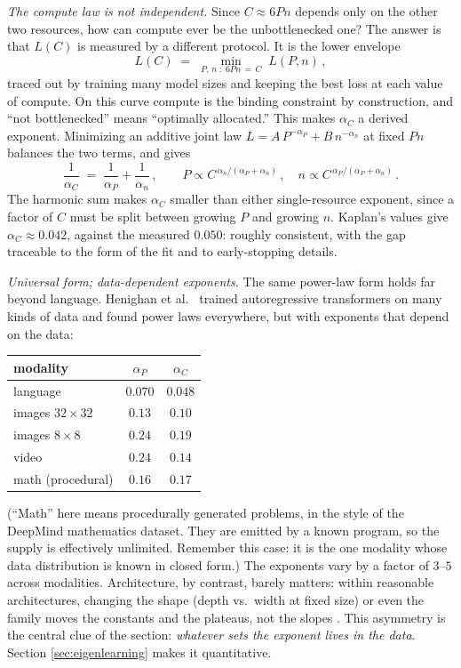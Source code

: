 \documentclass[11pt]{article}
\begin{document}
\emph{The compute law is not independent.} Since $C\approx 6Pn$ depends only on the other two resources, how can compute ever be the unbottlenecked one? The answer is that $L(C)$ is measured by a different protocol. It is the lower envelope
%
\begin{equation} \label{compute-envelope}
    L(C) \;=\; \min_{P,\,n\;:\;6Pn\,=\,C}\; L(P, n)\,,
\end{equation}
%
traced out by training many model sizes and keeping the best loss at each value of compute. On this curve compute is the binding constraint by construction, and ``not bottlenecked'' means ``optimally allocated.'' This makes $\alpha_C$ a derived exponent. Minimizing an additive joint law $L = A\,P^{-\alpha_P} + B\,n^{-\alpha_n}$ at fixed $Pn$ balances the two terms, and gives
%
\begin{equation} \label{harmonic}
    \frac{1}{\alpha_C} \;=\; \frac{1}{\alpha_P} + \frac{1}{\alpha_n}\,,
    \qquad
    P \propto C^{\,\alpha_n/(\alpha_P + \alpha_n)}\,,\quad
    n \propto C^{\,\alpha_P/(\alpha_P + \alpha_n)}\,.
\end{equation}
%
The harmonic sum makes $\alpha_C$ smaller than either single-resource exponent, since a factor of $C$ must be split between growing $P$ and growing $n$. Kaplan's values give $\alpha_C\approx 0.042$, against the measured $0.050$: roughly consistent, with the gap traceable to the form of the fit and to early-stopping details.

\emph{Universal form; data-dependent exponents.} The same power-law form holds far beyond language. Henighan et al.\ \cite{henighan2020scaling} trained autoregressive transformers on many kinds of data and found power laws everywhere, but with exponents that depend on the data:
%
\begin{center}
\small
\begin{tabular}{l|cc}
    modality & $\alpha_P$ & $\alpha_C$ \\\hline
    language & $0.070$ & $0.048$ \\
    images $32{\times}32$ & $0.13$ & $0.10$ \\
    images $8{\times}8$ & $0.24$ & $0.19$ \\
    video & $0.24$ & $0.14$ \\
    math (procedural) & $0.16$ & $0.17$
\end{tabular}
\end{center}
%
(``Math'' here means procedurally generated problems, in the style of the DeepMind mathematics dataset. They are emitted by a known program, so the supply is effectively unlimited. Remember this case: it is the one modality whose data distribution is known in closed form.) The exponents vary by a factor of $3$--$5$ across modalities. Architecture, by contrast, barely matters: within reasonable architectures, changing the shape (depth vs.\ width at fixed size) or even the family moves the constants and the plateaus, not the slopes \cite{kaplan2020scaling}. This asymmetry is the central clue of the section: \emph{whatever sets the exponent lives in the data}. Section \ref{sec:eigenlearning} makes it quantitative.
\end{document}
